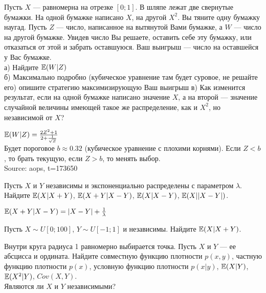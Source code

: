\begin{problem}
Пусть $X$ --- равномерна на отрезке $[0;1]$. В шляпе лежат две свернутые бумажки. На одной бумажке написано $X$, на другой $X^{2}$. Вы тяните одну бумажку наугад. Пусть $Z$ --- число, написанное на вытянутой Вами бумажке, а $W$ --- число на другой бумажке. Увидев число Вы решаете, оставить себе эту бумажку, или отказаться от этой и забрать оставшуюся. Ваш выигрыш --- число на оставшейся у Вас бумажке. \\
а) Найдите $\mathbb{E}(W|Z)$ \\
б) Максимально подробно (кубическое уравнение там будет суровое, не решайте его) опишите стратегию максимизирующую Ваш выигрыш 
в) Как изменится результат, если на одной бумажке написано значение $ X $, а на второй --- значение случайной величины имеющей такое же распределение, как и $ X^{2} $, но независимой от $ X $?


\end{problem} 
\begin{solution} 

$\mathbb{E}(W|Z)=\frac{2Z^{2}+1}{2+\frac{1}{\sqrt{Z}}}$ \\
Будет пороговое $b\approx 0.32$ (кубическое уравнение с плохими корнями). Если $Z<b$, то брать текущую, если $Z>b$, то менять выбор. \\
Source: aops, t=173650 
\end{solution}

\begin{problem}
Пусть $X$ и $Y$ независимы и экспоненциально распределены с параметром $\lambda$. \\
Найдите $\mathbb{E}(X|X+Y)$, $\mathbb{E}(X+Y|X-Y)$, $\mathbb{E}(X|X-Y)$, $\mathbb{E}(X||X-Y|)$. 
\end{problem} 
\begin{solution} 

 $\mathbb{E}(X+Y|X-Y)=|X-Y|+\frac{1}{\lambda}$ 
\end{solution}

\begin{problem}
Пусть $X\sim U[0;100]$, $Y\sim U[-1;1]$ и независимы. Найдите $\mathbb{E}(X|X+Y)$. 
\end{problem} 
\begin{solution} 

\end{solution}

\begin{problem}
Внутри круга радиуса 1 равномерно выбирается точка. Пусть $X$ и $Y$ --- ее абсцисса и ордината. Найдите совместную функцию плотности $p(x,y)$, частную функцию плотности $p(x)$, условную функцию плотности $p(x|y)$, $\mathbb{E}(X|Y)$, $\mathbb{E}(X^{2}|Y)$, $Cov(X,Y)$. \\
Являются ли $X$ и $Y$ независимыми? 
\end{problem} 
\begin{solution} 

\end{solution}

